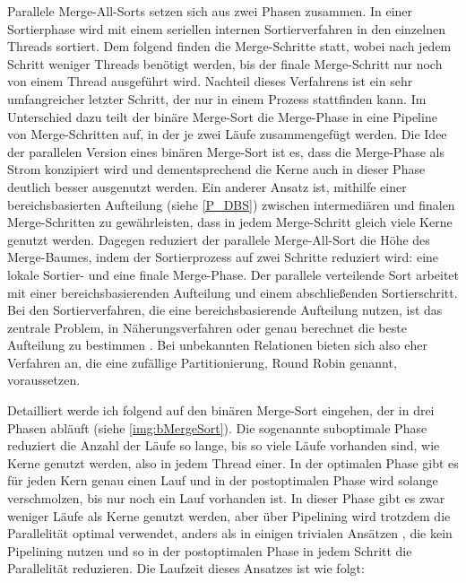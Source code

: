 \documentclass[a4paper,12pt,twoside]{article}
\begin{document}
Parallele Merge-All-Sorts \parencite[S. 831f]{Taniar2000} setzen sich aus zwei Phasen zusammen. In einer Sortierphase wird mit einem seriellen internen Sortierverfahren in den einzelnen Threads sortiert. Dem folgend finden die Merge-Schritte statt, wobei nach jedem Schritt weniger Threads benötigt werden, bis der finale Merge-Schritt nur noch von einem Thread ausgeführt wird. Nachteil dieses Verfahrens ist ein sehr umfangreicher letzter Schritt, der nur in einem Prozess stattfinden kann. Im Unterschied dazu teilt der binäre Merge-Sort \parencite[S. 832f]{Taniar2000} die Merge-Phase in eine Pipeline von Merge-Schritten auf, in der je zwei Läufe zusammengefügt werden. Die Idee der parallelen Version eines binären Merge-Sort \parencite[S. 833]{Taniar2000} ist es, dass die Merge-Phase als Strom konzipiert wird und dementsprechend die Kerne auch in dieser Phase deutlich besser ausgenutzt werden. Ein anderer Ansatz ist, mithilfe einer bereichsbasierten Aufteilung (siehe \autoref{P_DBS}) zwischen intermediären und finalen Merge-Schritten zu gewährleisten, dass in jedem Merge-Schritt gleich viele Kerne genutzt werden. Dagegen reduziert der parallele Merge-All-Sort \parencite[S. 833f]{Taniar2000} die Höhe des Merge-Baumes, indem der Sortierprozess auf zwei Schritte reduziert wird: eine lokale Sortier- und eine finale Merge-Phase. Der parallele verteilende Sort arbeitet mit einer bereichsbasierenden Aufteilung und einem abschließenden Sortierschritt. Bei den Sortierverfahren, die eine bereichsbasierende Aufteilung nutzen, ist das zentrale Problem, in Näherungsverfahren oder genau berechnet die beste Aufteilung zu bestimmen \parencite{Lu1994, Iyer1989}. Bei unbekannten Relationen bieten sich also eher Verfahren an, die eine zufällige Partitionierung, Round Robin genannt, voraussetzen.

Detailliert werde ich \textcite[S. 333ff]{Bitton1983} folgend auf den binären Merge-Sort eingehen, der in drei Phasen abläuft (siehe \autoref{img:bMergeSort}). Die sogenannte suboptimale Phase reduziert die Anzahl der Läufe so lange, bis so viele Läufe vorhanden sind, wie Kerne genutzt werden, also in jedem Thread einer. In der optimalen Phase gibt es für jeden Kern genau einen Lauf und in der postoptimalen Phase wird solange verschmolzen, bis nur noch ein Lauf vorhanden ist. In dieser Phase gibt es zwar weniger Läufe als Kerne genutzt werden, aber über Pipelining wird trotzdem die Parallelität optimal verwendet, anders als in einigen trivialen Ansätzen \parencite{Yu1998}, die kein Pipelining nutzen und so in der postoptimalen Phase in jedem Schritt die Parallelität reduzieren. Die Laufzeit dieses Ansatzes ist wie folgt:
\end{document}
